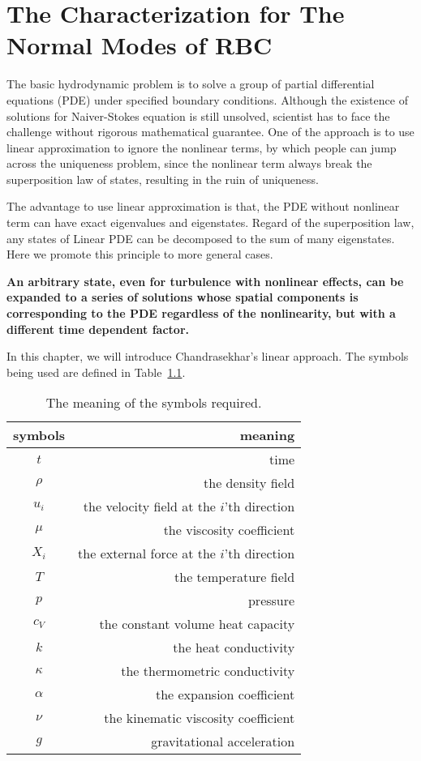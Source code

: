 \chapter{\label{chap:02}The Characterization for The Normal Modes of RBC}

The basic hydrodynamic problem is to solve a group of partial differential equations (PDE) under specified boundary conditions. Although the existence of solutions for Naiver-Stokes equation is still unsolved, scientist has to face the challenge without rigorous mathematical guarantee. One of the approach is to use linear approximation to ignore the nonlinear terms, by which people can jump across the uniqueness problem, since the nonlinear term always break the superposition law of states, resulting in the ruin of uniqueness.\par
The advantage to use linear approximation is that, the PDE without nonlinear term can have exact eigenvalues and eigenstates. Regard of the superposition law, any states of Linear PDE can be decomposed to the sum of many eigenstates. Here we promote this principle to more general cases.
\begin{center}
	\parbox[c]{0.9\linewidth}{\textbf{An arbitrary state, even for turbulence with nonlinear effects, can be expanded to a series of solutions whose spatial components is corresponding to the PDE regardless of the nonlinearity, but with a different time dependent factor.}}
\end{center}
In this chapter, we will introduce Chandrasekhar's linear approach. The symbols being used are defined in Table~\ref{tab:sym}.\par
\begin{table}[!ht]
	\centering
	\caption{The meaning of the symbols required.}
	\label{tab:sym}
		\begin{tabular}{cr}
			\toprule
			symbols & meaning \\
			\midrule
			\(t\) & time \\
			\(\rho\) & the density field \\
			\(u_i\) & the velocity field at the \(i\)'th direction \\
			\(\mu\) & the viscosity coefficient \\
			\(X_i\) & the external force at the \(i\)'th direction \\
			\(T\) & the temperature field \\
			\(p\) & pressure \\
			\(c_V\) & the constant volume heat capacity \\
			\(k\) & the heat conductivity \\
			\(\kappa\) & the thermometric conductivity \\
			\(\alpha\) & the expansion coefficient \\
			\(\nu\) & the kinematic viscosity coefficient \\
			\(g\) & gravitational acceleration \\
			\bottomrule
		\end{tabular}
\end{table}


